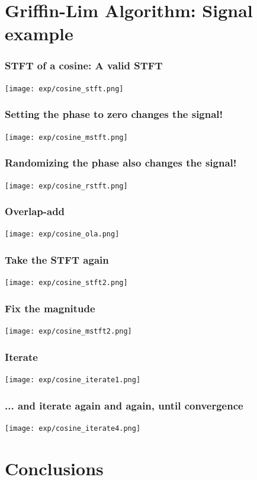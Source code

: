 \documentclass{beamer}
\begin{document}
\section[Vectors]{Griffin-Lim Algorithm: Signal example}
\setcounter{subsection}{1}

\begin{frame}
  \frametitle{STFT of a cosine: A valid STFT}
  \centerline{\texttt{[image: exp/cosine\_stft.png]}}  
\end{frame}

\begin{frame}
  \frametitle{Setting the phase to zero changes the signal!}
  \centerline{\texttt{[image: exp/cosine\_mstft.png]}}  
\end{frame}

\begin{frame}
  \frametitle{Randomizing the phase also changes the signal!}
  \centerline{\texttt{[image: exp/cosine\_rstft.png]}}  
\end{frame}

\begin{frame}
  \frametitle{Overlap-add}
  \centerline{\texttt{[image: exp/cosine\_ola.png]}}  
\end{frame}

\begin{frame}
  \frametitle{Take the STFT again}
  \centerline{\texttt{[image: exp/cosine\_stft2.png]}}  
\end{frame}

\begin{frame}
  \frametitle{Fix the magnitude}
  \centerline{\texttt{[image: exp/cosine\_mstft2.png]}}  
\end{frame}

\begin{frame}
  \frametitle{Iterate}
  \centerline{\texttt{[image: exp/cosine\_iterate1.png]}}  
\end{frame}

\begin{frame}
  \frametitle{... and iterate again and again, until convergence}
  \centerline{\texttt{[image: exp/cosine\_iterate4.png]}}  
\end{frame}

\section{Conclusions}
\setcounter{subsection}{1}
\end{document}
